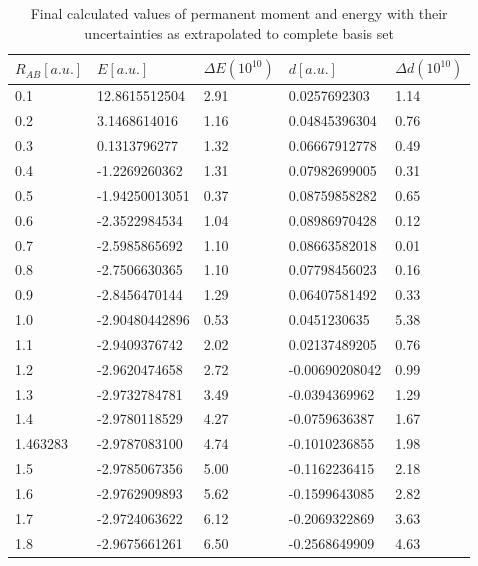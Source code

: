 \documentclass{pracalicmgr}
\begin{document}
\begin{longtable}[c]{lllll}
    \caption{Final calculated values of permanent moment and energy with their uncertainties as extrapolated to complete basis set}
    \label{Results}\\
    \hline
    \textbf{$R_{AB}[a.u.]$} & \textbf{$E[a.u.]$} & \textbf{$\Delta E \left(10^{10}\right)$} & \textbf{$d[a.u.]$} & \textbf{$\Delta d \left(10^{10}\right)$} \\ \hline
    \endfirsthead
    \endhead
    \hline
    \endfoot
    \endlastfoot
    0.1 & 12.8615512504  & 2.91   & 0.0257692303   & 1.14    \\
    0.2 & 3.1468614016   & 1.16   & 0.04845396304  & 0.76    \\
    0.3 & 0.1313796277   & 1.32   & 0.06667912778  & 0.49    \\
    0.4 & -1.2269260362  & 1.31   & 0.07982699005  & 0.31    \\
    0.5 & -1.94250013051 & 0.37   & 0.08759858282  & 0.65    \\
    0.6 & -2.3522984534  & 1.04   & 0.08986970428  & 0.12    \\
    0.7 & -2.5985865692  & 1.10   & 0.08663582018  & 0.01    \\
    0.8 & -2.7506630365  & 1.10   & 0.07798456023  & 0.16    \\
    0.9 & -2.8456470144  & 1.29   & 0.06407581492  & 0.33    \\
    1.0 & -2.90480442896 & 0.53   & 0.0451230635   & 5.38    \\
    1.1 & -2.9409376742  & 2.02   & 0.02137489205  & 0.76    \\
    1.2 & -2.9620474658  & 2.72   & -0.00690208042 & 0.99    \\
    1.3 & -2.9732784781  & 3.49   & -0.0394369962  & 1.29    \\
    1.4 & -2.9780118529  & 4.27   & -0.0759636387  & 1.67    \\
    1.463283                & -2.9787083100      & 4.74                                   & -0.1010236855      & 1.98                                   \\
    1.5 & -2.9785067356  & 5.00   & -0.1162236415  & 2.18    \\
    1.6 & -2.9762909893  & 5.62   & -0.1599643085  & 2.82    \\
    1.7 & -2.9724063622  & 6.12   & -0.2069322869  & 3.63    \\
    1.8 & -2.9675661261  & 6.50   & -0.2568649909  & 4.63    \\

\end{longtable}
\end{document}
